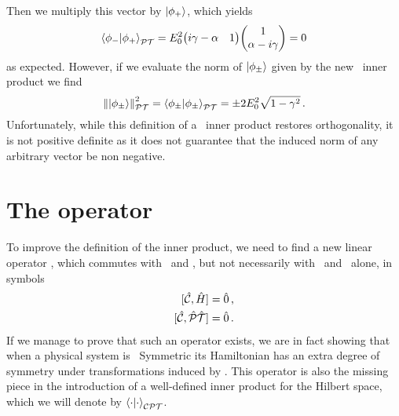             Then we multiply this vector by $\ket{\phi_+}$, which yields
            \begin{equation*}
                \braket{\phi_-}{\phi_+}_{\PT} = E_0^2 \!\pmqty{i\gamma - \alpha & 1} \!\pmqty{1\\ \alpha - i \gamma} = 0
            \end{equation*}
            as expected. However, if we evaluate the norm of $\ket{\phi_\pm}$ given by the new \PT\ inner product we find
            \begin{equation*}
                \norm{\ket{\phi_\pm}}^2_{\mathcal{P}\mathcal{T}} = \braket{\phi_\pm}{\phi_\pm}_{\mathcal{P}\mathcal{T}} = \pm 2 E_0^2 \sqrt{1 - \gamma^2}
                \,\text{.}
            \end{equation*}
            Unfortunately, while this definition of a \PT\ inner product restores orthogonality, it is not positive definite as it does not guarantee that the induced norm of any arbitrary vector be non negative.

    \section{The \texorpdfstring{\hC}{C} operator}
        To improve the definition of the inner product, we need to find a new linear operator \hC, which commutes with \hH\ and \hPT, but not necessarily with \hP\ and \hT\ alone, in symbols
        \begin{align}
            \label{eq:C-H-commutator}
            \comm*{\hC}{\hH}\! &= \hzero
            \mycomma
            \\
            \label{eq:C-PT-commutator}
            \comm*{\hC}{\hPT}\! &= \hzero
            \myperiod
        \end{align}
        If we manage to prove that such an operator exists, we are in fact showing that when a physical system is \PT\ Symmetric its Hamiltonian has an extra degree of symmetry under transformations induced by \hC. This operator is also the missing piece in the introduction of a well-defined inner product for the Hilbert space, which we will denote by $\braket{\cdot}{\cdot}_{\mathcal{C}\mathcal{P}\mathcal{T}}$.

